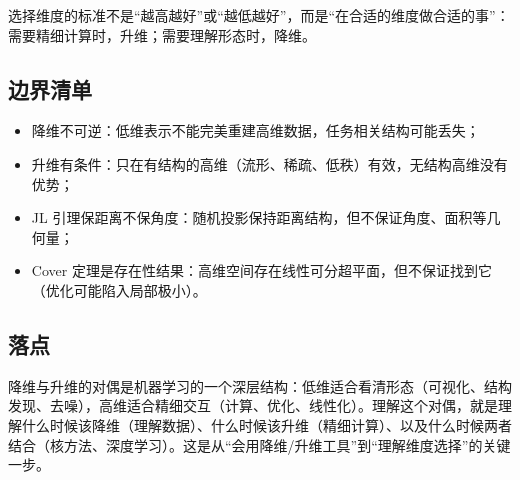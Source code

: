 选择维度的标准不是``越高越好''或``越低越好''，而是``在合适的维度做合适的事''：需要精细计算时，升维；需要理解形态时，降维。

\subsection{边界清单}

\begin{itemize}
\tightlist
\item
  降维不可逆：低维表示不能完美重建高维数据，任务相关结构可能丢失；
\item
  升维有条件：只在有结构的高维（流形、稀疏、低秩）有效，无结构高维没有优势；
\item
  JL 引理保距离不保角度：随机投影保持距离结构，但不保证角度、面积等几何量；
\item
  Cover 定理是存在性结果：高维空间存在线性可分超平面，但不保证找到它（优化可能陷入局部极小）。
\end{itemize}

\subsection{落点}

降维与升维的对偶是机器学习的一个深层结构：低维适合看清形态（可视化、结构发现、去噪），高维适合精细交互（计算、优化、线性化）。理解这个对偶，就是理解什么时候该降维（理解数据）、什么时候该升维（精细计算）、以及什么时候两者结合（核方法、深度学习）。这是从``会用降维/升维工具''到``理解维度选择''的关键一步。
